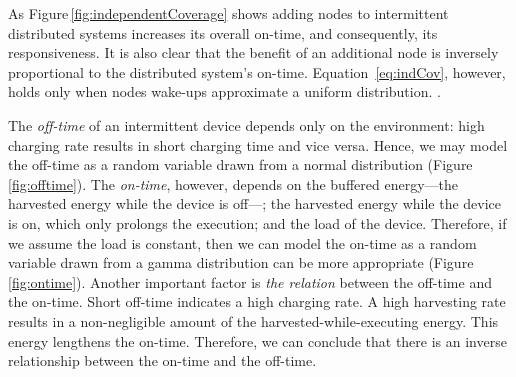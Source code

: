 As Figure\,\ref{fig:independentCoverage} shows adding nodes to intermittent distributed systems increases its overall on-time, and consequently, its responsiveness. It is also clear that the benefit of an additional node is inversely proportional to the distributed system's on-time. Equation~\ref{eq:indCov}, however, holds only when nodes wake-ups approximate a uniform distribution. . 


The \textit{off-time} of an intermittent device depends only on the environment: high charging rate results in short charging time and vice versa. Hence, we may model the off-time as a random variable drawn from a normal distribution (Figure\,\ref{fig:offtime}). The \textit{on-time}, however, depends on the buffered energy---the harvested energy while the device is off---; the harvested energy while the device is on, which only prolongs the execution; and the load of the device. Therefore, if we assume the load is constant, then we can model the on-time as a random variable drawn from a gamma distribution can be more appropriate (Figure\,\ref{fig:ontime}). Another important factor is \textit{the relation} between the off-time and the on-time. Short off-time indicates a high charging rate. A high harvesting rate results in a non-negligible amount of the harvested-while-executing energy. This energy lengthens the on-time. Therefore, we can conclude that there is an inverse relationship between the on-time and the off-time.

%
%

